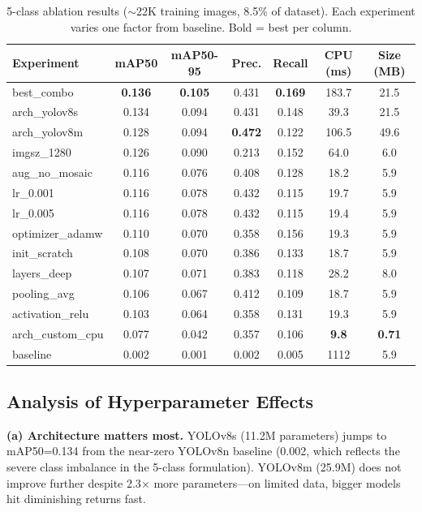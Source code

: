 \documentclass{article}
\begin{document}
\begin{table}[t]
\centering
\caption{5-class ablation results ($\sim$22K training images, 8.5\% of dataset). Each experiment varies one factor from baseline. Bold = best per column.}
\label{tab:yolo_results}
\small
\begin{tabular}{lcccccc}
\toprule
Experiment & mAP50 & mAP50-95 & Prec. & Recall & CPU (ms) & Size (MB) \\
\midrule
best\_combo & \textbf{0.136} & \textbf{0.105} & 0.431 & \textbf{0.169} & 183.7 & 21.5 \\
arch\_yolov8s & 0.134 & 0.094 & 0.431 & 0.148 & 39.3 & 21.5 \\
arch\_yolov8m & 0.128 & 0.094 & \textbf{0.472} & 0.122 & 106.5 & 49.6 \\
imgsz\_1280 & 0.126 & 0.090 & 0.213 & 0.152 & 64.0 & 6.0 \\
aug\_no\_mosaic & 0.116 & 0.076 & 0.408 & 0.128 & 18.2 & 5.9 \\
lr\_0.001 & 0.116 & 0.078 & 0.432 & 0.115 & 19.7 & 5.9 \\
lr\_0.005 & 0.116 & 0.078 & 0.432 & 0.115 & 19.4 & 5.9 \\
optimizer\_adamw & 0.110 & 0.070 & 0.358 & 0.156 & 19.3 & 5.9 \\
init\_scratch & 0.108 & 0.070 & 0.386 & 0.133 & 18.7 & 5.9 \\
layers\_deep & 0.107 & 0.071 & 0.383 & 0.118 & 28.2 & 8.0 \\
pooling\_avg & 0.106 & 0.067 & 0.412 & 0.109 & 18.7 & 5.9 \\
activation\_relu & 0.103 & 0.064 & 0.358 & 0.131 & 19.3 & 5.9 \\
arch\_custom\_cpu & 0.077 & 0.042 & 0.357 & 0.106 & \textbf{9.8} & \textbf{0.71} \\
baseline & 0.002 & 0.001 & 0.002 & 0.005 & 1112 & 5.9 \\
\bottomrule
\end{tabular}
\end{table}

\subsection{Analysis of Hyperparameter Effects}

\textbf{(a) Architecture matters most.} YOLOv8s (11.2M parameters) jumps to mAP50=0.134 from the near-zero YOLOv8n baseline (0.002, which reflects the severe class imbalance in the 5-class formulation). YOLOv8m (25.9M) does not improve further despite 2.3$\times$ more parameters---on limited data, bigger models hit diminishing returns fast.
\end{document}
